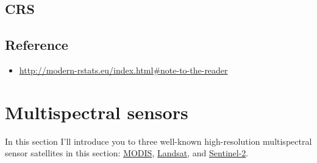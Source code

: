 \documentclass[
]{book}
\providecommand{\tightlist}{%
  \setlength{\itemsep}{0pt}\setlength{\parskip}{0pt}}
\begin{document}
\hypertarget{crs}{%
\section{CRS}\label{crs}}

\hypertarget{reference}{%
\section{Reference}\label{reference}}

\begin{itemize}
\tightlist
\item
  \url{http://modern-rstats.eu/index.html\#note-to-the-reader}
\end{itemize}

\hypertarget{multispectral-sensors}{%
\chapter{Multispectral sensors}\label{multispectral-sensors}}

In this section I'll introduce you to three well-known high-resolution multispectral sensor satellites in this section: \href{https://modis.gsfc.nasa.gov/}{MODIS}, \href{https://landsat.gsfc.nasa.gov/}{Landsat}, and \href{https://www.esa.int/Applications/Observing_the_Earth/Copernicus/Sentinel-2}{Sentinel-2}.

  
\end{document}
